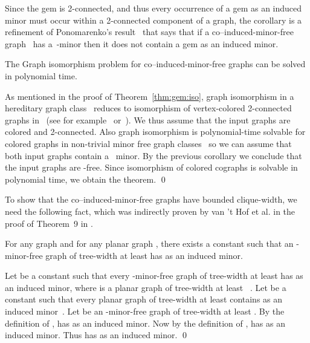\documentclass[envcountsame,envcountsect,11pt,a4paper]{llncs}
\renewenvironment{proof}{\begin{Proof}}{\qed\end{Proof}}
\begin{document}
Since the gem is 2-connected, and thus every occurrence of a gem as an induced minor must occur within a 2-connected component of a graph, the
corollary is a refinement of Ponomarenko's result~\cite{Ponomarenko88} that says that if a co--induced-minor-free
graph~ has a~-minor then it does not contain a gem as an induced minor.

\begin{theorem}
\label{thm:ger:house:iso}
The Graph isomorphism problem for co--induced-minor-free graphs can be solved in polynomial time.
\end{theorem}
\begin{proof}
As mentioned in the proof of Theorem~\ref{thm:gem:iso}, graph isomorphism in a hereditary graph class~ reduces to
isomorphism of vertex-colored 2-connected graphs in~ (see for example~\cite{DBLP:conf/coco/DattaLNTW09} or~\cite{OtachiS14}).
We thus assume that the input graphs are colored and 2-connected. Also graph isomorphism is polynomial-time solvable for colored graphs in
non-trivial minor free graph classes~\cite{Ponomarenko88} so we can assume that both input graphs contain a~ minor. By the previous
corollary we conclude that the input graphs are -free. Since isomorphism of colored cographs is solvable in polynomial
time, we obtain the theorem.
\end{proof}

To show that the co--induced-minor-free graphs have bounded clique-width, we need the following fact, which was indirectly proven by van 't Hof et al. in the proof of Theorem~9 in \cite{VantHofKaminskiPaulusmaSzeiderThilikos2012}.

\begin{theorem}
\label{lem:tw->indmin}
For any graph  and for any planar graph , there exists a constant  such that an -minor-free graph of tree-width
at least  has  as an induced minor.
\end{theorem}
\begin{proof}
Let  be a constant such that every -minor-free graph of tree-width
at least  has  as an induced minor,
where  is a planar graph of tree-width at least ~\cite{FominGT09}.
Let  be a constant such that every planar graph of tree-width at least 
contains  as an induced minor~\cite{FKMP95}.
Let  be an -minor-free graph of tree-width at least .
By the definition of ,  has  as an induced minor.
Now by the definition of ,  has  as an induced minor.
Thus  has  as an induced minor.
\end{proof}
\end{document}
